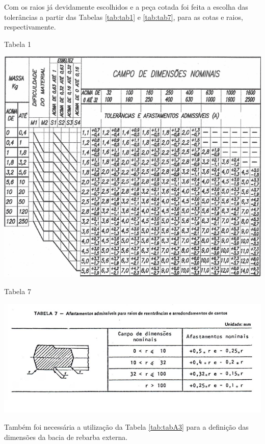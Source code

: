 \documentclass[deposito, acronym, symbols]{fei}
\begin{document}
\newpage

Com os raios já devidamente escolhidos e a peça cotada foi feita a escolha das tolerâncias a partir das Tabelas \ref{tab:tab1} e \ref{tab:tab7}, para as cotas e raios, respectivamente.

\begin{table}[!htb]
 \centering
    \caption{Tabela 1}
    \includegraphics[width=1\linewidth]{Imagens/Tabela 1.png}
    \label{tab:tab1}
\end{table}

\begin{table}[!htb]
 \centering
    \caption{Tabela 7}
    \includegraphics[width=1\linewidth]{Imagens/Tabela 7.png}
    \label{tab:tab7}
\end{table}
\newpage
Também foi necessária a utilização da Tabela \ref{tab:tabA3} para a definição das dimensões da bacia de rebarba externa.
\end{document}
